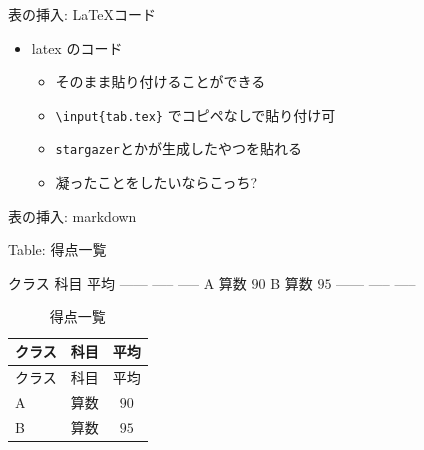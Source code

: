 \documentclass[
  14pt,
  ignorenonframetext,
]{beamer}
\newenvironment{Shaded}{\begin{snugshade}}{\end{snugshade}}
\newcommand{\DataTypeTok}[1]{\textcolor[rgb]{0.13,0.29,0.53}{#1}}
\newcommand{\KeywordTok}[1]{\textcolor[rgb]{0.13,0.29,0.53}{\textbf{#1}}}
\newcommand{\NormalTok}[1]{#1}
\newcommand{\OperatorTok}[1]{\textcolor[rgb]{0.81,0.36,0.00}{\textbf{#1}}}
\newcommand{\StringTok}[1]{\textcolor[rgb]{0.31,0.60,0.02}{#1}}
\providecommand{\tightlist}{%
  \setlength{\itemsep}{0pt}\setlength{\parskip}{0pt}}
\begin{document}
\begin{frame}[fragile]{表の挿入: LaTeXコード}
\protect\hypertarget{ux8868ux306eux633fux5165-latexux30b3ux30fcux30c9}{}

\begin{itemize}
\tightlist
\item
  latex のコード

  \begin{itemize}
  \tightlist
  \item
    そのまま貼り付けることができる
  \item
    \texttt{\textbackslash{}input\{tab.tex\}} でコピペなしで貼り付け可
  \item
    \texttt{stargazer}とかが生成したやつを貼れる
  \item
    凝ったことをしたいならこっち?
  \end{itemize}
\end{itemize}

\begin{Shaded}
\end{Shaded}



\end{frame}

\begin{frame}[fragile]{表の挿入: markdown}
\protect\hypertarget{ux8868ux306eux633fux5165-markdown}{}

\small

\begin{Shaded}
\begin{Highlighting}[]
\NormalTok{Table: 得点一覧}

\NormalTok{  クラス 科目   平均}
\NormalTok{  ------ ----- -----}
\NormalTok{  A      算数   $90$}
\NormalTok{  B      算数   $95$}
\NormalTok{  ------ ----- -----}
\end{Highlighting}
\end{Shaded}

\normalsize

\begin{longtable}[]{@{}llc@{}}
\caption{得点一覧}\tabularnewline
\toprule
クラス & 科目 & 平均\tabularnewline
\midrule
\endfirsthead
\toprule
クラス & 科目 & 平均\tabularnewline
\midrule
\endhead
A & 算数 & \(90\)\tabularnewline
B & 算数 & \(95\)\tabularnewline
\bottomrule
\end{longtable}

\end{frame}
\end{document}
